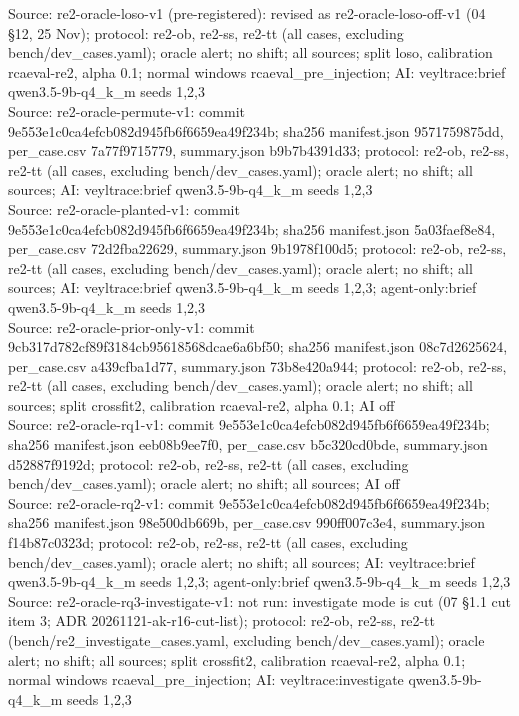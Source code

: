 \begin{table}[t]
Source: re2-oracle-loso-v1 (pre-registered): revised as re2-oracle-loso-off-v1 (04 \S{}12, 25 Nov); protocol: re2-ob, re2-ss, re2-tt (all cases, excluding bench/dev\_cases.yaml); oracle alert; no shift; all sources; split loso, calibration rcaeval-re2, alpha 0.1; normal windows rcaeval\_pre\_injection; AI: veyltrace:brief qwen3.5-9b-q4\_k\_m seeds 1,2,3\\
Source: re2-oracle-permute-v1: commit 9e553e1c0ca4efcb082d945fb6f6659ea49f234b; sha256 manifest.json 9571759875dd, per\_case.csv 7a77f9715779, summary.json b9b7b4391d33; protocol: re2-ob, re2-ss, re2-tt (all cases, excluding bench/dev\_cases.yaml); oracle alert; no shift; all sources; AI: veyltrace:brief qwen3.5-9b-q4\_k\_m seeds 1,2,3\\
Source: re2-oracle-planted-v1: commit 9e553e1c0ca4efcb082d945fb6f6659ea49f234b; sha256 manifest.json 5a03faef8e84, per\_case.csv 72d2fba22629, summary.json 9b1978f100d5; protocol: re2-ob, re2-ss, re2-tt (all cases, excluding bench/dev\_cases.yaml); oracle alert; no shift; all sources; AI: veyltrace:brief qwen3.5-9b-q4\_k\_m seeds 1,2,3; agent-only:brief qwen3.5-9b-q4\_k\_m seeds 1,2,3\\
Source: re2-oracle-prior-only-v1: commit 9cb317d782cf89f3184cb95618568dcae6a6bf50; sha256 manifest.json 08c7d2625624, per\_case.csv a439cfba1d77, summary.json 73b8e420a944; protocol: re2-ob, re2-ss, re2-tt (all cases, excluding bench/dev\_cases.yaml); oracle alert; no shift; all sources; split crossfit2, calibration rcaeval-re2, alpha 0.1; AI off\\
Source: re2-oracle-rq1-v1: commit 9e553e1c0ca4efcb082d945fb6f6659ea49f234b; sha256 manifest.json eeb08b9ee7f0, per\_case.csv b5c320cd0bde, summary.json d52887f9192d; protocol: re2-ob, re2-ss, re2-tt (all cases, excluding bench/dev\_cases.yaml); oracle alert; no shift; all sources; AI off\\
Source: re2-oracle-rq2-v1: commit 9e553e1c0ca4efcb082d945fb6f6659ea49f234b; sha256 manifest.json 98e500db669b, per\_case.csv 990ff007c3e4, summary.json f14b87c0323d; protocol: re2-ob, re2-ss, re2-tt (all cases, excluding bench/dev\_cases.yaml); oracle alert; no shift; all sources; AI: veyltrace:brief qwen3.5-9b-q4\_k\_m seeds 1,2,3; agent-only:brief qwen3.5-9b-q4\_k\_m seeds 1,2,3\\
Source: re2-oracle-rq3-investigate-v1: not run: investigate mode is cut (07 \S{}1.1 cut item 3; ADR 20261121-ak-r16-cut-list); protocol: re2-ob, re2-ss, re2-tt (bench/re2\_investigate\_cases.yaml, excluding bench/dev\_cases.yaml); oracle alert; no shift; all sources; split crossfit2, calibration rcaeval-re2, alpha 0.1; normal windows rcaeval\_pre\_injection; AI: veyltrace:investigate qwen3.5-9b-q4\_k\_m seeds 1,2,3\\

\end{table}
